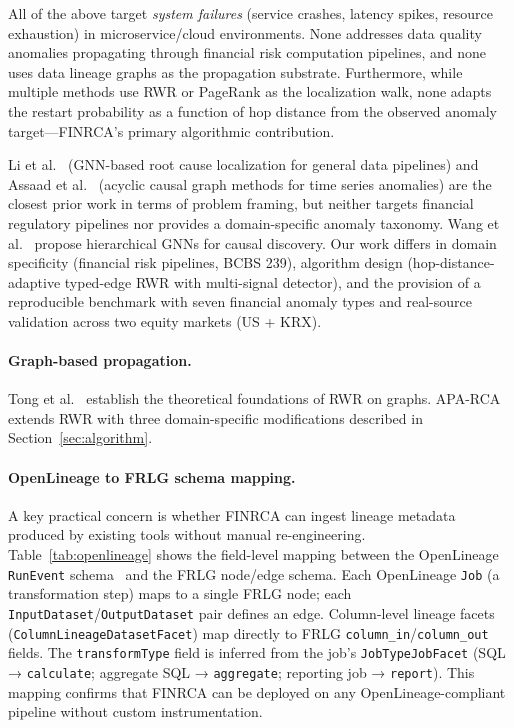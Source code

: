 \documentclass{article}
\newcommand{\aparca}{\textsc{APA-RCA}}
\begin{document}
All of the above target \emph{system failures} (service crashes, latency spikes,
resource exhaustion) in microservice/cloud environments.
None addresses data quality anomalies propagating through financial risk
computation pipelines, and none uses data lineage graphs as the propagation
substrate.
Furthermore, while multiple methods use RWR or PageRank as the localization walk,
none adapts the restart probability as a function of hop distance from the observed
anomaly target---FINRCA's primary algorithmic contribution.

Li et al.~\cite{li2024gnn} (GNN-based root cause localization for general data
pipelines) and Assaad et al.~\cite{assaad2023rootcause} (acyclic causal graph
methods for time series anomalies) are the closest prior work in terms of problem
framing, but neither targets financial regulatory pipelines nor provides a
domain-specific anomaly taxonomy.
Wang et al.~\cite{wang2023hierarchical} propose hierarchical GNNs for causal
discovery.
Our work differs in domain specificity (financial risk pipelines, BCBS 239),
algorithm design (hop-distance-adaptive typed-edge RWR with multi-signal detector),
and the provision of a reproducible benchmark with seven financial anomaly types
and real-source validation across two equity markets (US + KRX).

\paragraph{Graph-based propagation.}
Tong et al.~\cite{tong2006rwr} establish the theoretical foundations of RWR
on graphs.
\aparca{} extends RWR with three domain-specific modifications described in
Section~\ref{sec:algorithm}.

\paragraph{OpenLineage to FRLG schema mapping.}
A key practical concern is whether FINRCA can ingest lineage metadata produced
by existing tools without manual re-engineering.
Table~\ref{tab:openlineage} shows the field-level mapping between the
OpenLineage \texttt{RunEvent} schema~\cite{openlineage} and the FRLG node/edge
schema.
Each OpenLineage \texttt{Job} (a transformation step) maps to a single FRLG
node; each \texttt{InputDataset}/\texttt{OutputDataset} pair defines an edge.
Column-level lineage facets (\texttt{ColumnLineageDatasetFacet}) map directly
to FRLG \texttt{column\_in}/\texttt{column\_out} fields.
The \texttt{transformType} field is inferred from the job's
\texttt{JobTypeJobFacet} (SQL → \texttt{calculate}; aggregate SQL → \texttt{aggregate};
reporting job → \texttt{report}).
This mapping confirms that FINRCA can be deployed on any OpenLineage-compliant
pipeline without custom instrumentation.
\end{document}
